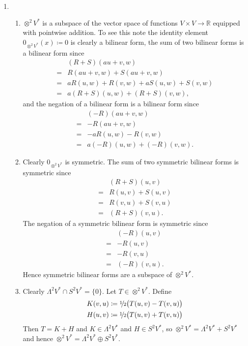 \documentclass[a4paper, 12pt]{article}
\newcommand{\R}{\mathbb{R}}
\newcommand{\half}{\sfrac{1\!}2}
\begin{document}
\begin{enumerate}

\item \begin{enumerate}

\item \(\otimes^2V^*\) is a subspace of the vector space of functions \(V\times V\to\R\) equipped with pointwise addition. To see this note the identity element \(0_{\otimes^2V^*}(x)\coloneqq0\) is clearly a bilinear form, the sum of two bilinear forms is a bilinear form since
\begin{align*}
&(R+S)(au+v,w)\\
={}&R(au+v,w)+S(au+v,w)\\
={}&aR(u,w)+R(v,w)+aS(u,w)+S(v,w)\\
={}&a(R+S)(u,w)+(R+S)(v,w),
\end{align*}
and the negation of a bilinear form is a bilinear form since
\begin{align*}
&(-R)(au+v,w)\\
={}&-R(au+v,w)\\
={}&-aR(u,w)-R(v,w)\\
={}&a(-R)(u,w)+(-R)(v,w).
\end{align*}

\item Clearly \(0_{\otimes^2V^*}\) is symmetric. The sum of two symmetric bilinear forms is symmetric since
\begin{align*}
&(R+S)(u,v)\\
={}&R(u,v)+S(u,v)\\
={}&R(v,u)+S(v,u)\\
={}&(R+S)(v,u).
\end{align*}
The negation of a symmetric bilinear form is symmetric since
\begin{align*}
&(-R)(u,v)\\
={}&-R(u,v)\\
={}&-R(v,u)\\
={}&(-R)(v,u).
\end{align*}
Hence symmetric bilinear forms are a subspace of \(\otimes^2V^*\).

\item Clearly \(\Lambda^2V^*\cap S^2V^*=\{0\}\). Let \(T\in\otimes^2V^*\). Define
\begin{gather*}
K(v,u)\coloneqq\half\big(T(u,v)-T(v,u)\big)\\
H(u,v)\coloneqq\half\big(T(u,v)+T(v,u)\big)
\end{gather*}
Then \(T=K+H\) and \(K\in\Lambda^2V^*\) and \(H\in S^2V^*\), so \(\otimes^2V^*=\Lambda^2V^*+S^2V^*\) and hence \(\otimes^2V^*=\Lambda^2V^*\oplus S^2V^*\).


\end{enumerate}
\end{enumerate}
\end{document}

